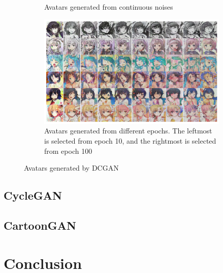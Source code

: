 \documentclass[10pt,twocolumn,letterpaper]{article}
\begin{document}
\begin{figure}[htb]
\begin{subfigure}{.48\linewidth}
      \caption{Avatars generated from continuous noises}
   \end{subfigure}
   \begin{subfigure}{.8\linewidth}
      \centering
      \includegraphics[width=\linewidth]{dcgan-result-training.png}
      \caption{Avatars generated from different epochs. The leftmost is
      selected from epoch 10, and the rightmost is selected from epoch 100}
   \end{subfigure}
   \caption{Avatars generated by DCGAN}
   \label{fig:dcgan-examples}
\end{figure}

\subsection{CycleGAN}

\subsection{CartoonGAN}

\section{Conclusion}

{\small


}
\end{document}
